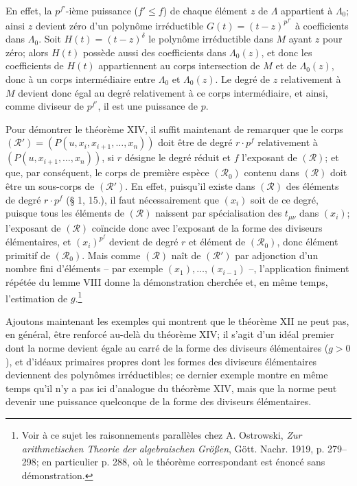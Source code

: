 En effet, la $p^{f'}$-ième puissance ($f'\le f$) de chaque élément $z$ de $\Lambda$ appartient à $\Lambda_0$; ainsi $z$ devient zéro d'un polynôme irréductible $G(t)=(t-z)^{p^{f'}}$ à coefficients dans $\Lambda_0$. Soit $H(t)=(t-z)^\delta$ le polynôme irréductible dans $M$ ayant $z$ pour zéro; alors $H(t)$ possède aussi des coefficients dans $\Lambda_0(z)$, et donc les coefficients de $H(t)$ appartiennent au corps intersection de $M$ et de $\Lambda_0(z)$, donc à un corps intermédiaire entre $\Lambda_0$ et $\Lambda_0(z)$. Le degré de $z$ relativement à $M$ devient donc égal au degré relativement à ce corps intermédiaire, et ainsi, comme diviseur de $p^{f'}$, il est une puissance de $p$.

Pour démontrer le théorème XIV, il suffit maintenant de remarquer que le corps $(\mathcal R')=(P(u,x_i,x_{i+1},\ldots,x_n))$ doit être de degré $r\cdot p^f$ relativement à $(P(u,x_{i+1},\ldots,x_n))$, si $r$ désigne le degré réduit et $f$ l'exposant de $(\mathcal R)$; et que, par conséquent, le corps de première espèce $(\mathcal R_0)$ contenu dans $(\mathcal R)$ doit être un sous-corps de $(\mathcal R')$. En effet, puisqu'il existe dans $(\mathcal R)$ des éléments de degré $r\cdot p^f$ (\S{} 1, 15.), il faut nécessairement que $(x_i)$ soit de ce degré, puisque tous les éléments de $(\mathcal R)$ naissent par spécialisation des $t_{\mu\nu}$ dans $(x_i)$; l'exposant de $(\mathcal R)$ coïncide donc avec l'exposant de la forme des diviseurs élémentaires, et $(x_i)^{p^f}$ devient de degré $r$ et élément de $(\mathcal R_0)$, donc élément primitif de $(\mathcal R_0)$. Mais comme $(\mathcal R)$ naît de $(\mathcal R')$ par adjonction d'un nombre fini d'éléments -- par exemple $(x_1),\ldots,(x_{i-1})$ --, l'application finiment répétée du lemme VIII donne la démonstration cherchée et, en même temps, l'estimation de $g$.\footnote{Voir à ce sujet les raisonnements parallèles chez A. Ostrowski, \emph{Zur arithmetischen Theorie der algebraischen Größen}, Gött. Nachr. 1919, p. 279--298; en particulier p. 288, où le théorème correspondant est énoncé sans démonstration.}

Ajoutons maintenant les exemples qui montrent que le théorème XII ne peut pas, en général, être renforcé au-delà du théorème XIV; il s'agit d'un idéal premier dont la norme devient égale au carré de la forme des diviseurs élémentaires ($g>0$), et d'idéaux primaires propres dont les formes des diviseurs élémentaires deviennent des polynômes irréductibles; ce dernier exemple montre en même temps qu'il n'y a pas ici d'analogue du théorème XIV, mais que la norme peut devenir une puissance quelconque de la forme des diviseurs élémentaires.

